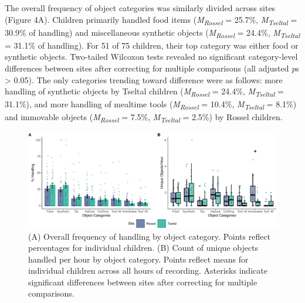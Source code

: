 \documentclass[10pt, letterpaper]{article}
\newenvironment{CodeChunk}{}{}
\begin{document}
The overall frequency of object categories was similarly divided across
sites (Figure 4A). Children primarily handled food items
(\emph{M}\textsubscript{\emph{Rossel}} = 25.7\%,
\emph{M}\textsubscript{\emph{Tseltal}} = 30.9\% of handling) and
miscellaneous synthetic objects (\emph{M}\textsubscript{\emph{Rossel}} =
24.4\%, \emph{M}\textsubscript{\emph{Tseltal}} = 31.1\% of handling).
For 51 of 75 children, their top category was either food or synthetic
objects. Two-tailed Wilcoxon tests revealed no significant
category-level differences between sites after correcting for multiple
comparisons (all adjusted \emph{p}s \textgreater{} 0.05). The only
categories trending toward difference were as follows: more handling of
synthetic objects by Tseltal children
(\emph{M}\textsubscript{\emph{Rossel}} = 24.4\%,
\emph{M}\textsubscript{\emph{Tseltal}} = 31.1\%), and more handling of
mealtime tools (\emph{M}\textsubscript{\emph{Rossel}} = 10.4\%,
\emph{M}\textsubscript{\emph{Tseltal}} = 8.1\%) and immovable objects
(\emph{M}\textsubscript{\emph{Rossel}} = 7.5\%,
\emph{M}\textsubscript{\emph{Tseltal}} = 2.5\%) by Rossel children.

\begin{CodeChunk}
\begin{figure}[!h]

{\centering \includegraphics{figs/overall-stats-fig-1} 

}

\caption[(A) Overall frequency of handling by object category]{(A) Overall frequency of handling by object category. Points reflect percentages for individual children. (B) Count of unique objects handled per hour by object category. Points reflect means for individual children across all hours of recording. Asterisks indicate significant differences between sites after correcting for multiple comparisons.}\label{fig:overall-stats-fig}
\end{figure}
\end{CodeChunk}
\end{document}
